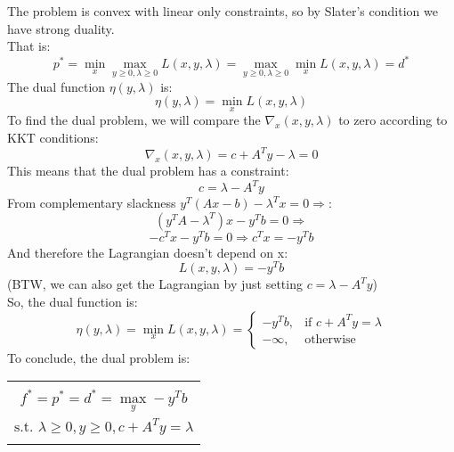 \documentclass[12pt]{article}
\newcommand{\rectres}[1]{
\begin{center}
\begin{tabular}{ |c| }
\hline
\\
 #1\\
 \\
\hline
\end{tabular}
\end{center}
}
\begin{document}
The problem is convex with linear only constraints, so by Slater's condition we have strong duality.\\
That is:
$$p^*=\min_x \max_{y \geq 0,\lambda \geq 0} L(x,y,\lambda) = \max_{y \geq 0,\lambda \geq 0} \min_x  L(x,y,\lambda) = d^*$$
The dual function $\eta(y,\lambda)$ is:
$$\eta(y,\lambda) = \min_x  L(x,y,\lambda)$$
To find the dual problem, we will compare the $\nabla_x (x,y,\lambda)$ to zero according to KKT conditions:\\
$$\nabla_x (x,y,\lambda) = c + A^Ty - \lambda = 0$$
This means that the dual problem has a constraint:\\
$$c = \lambda-A^Ty $$
From complementary slackness $y^T (Ax-b) -\lambda^T x= 0 \Rightarrow$:
$$(y^T A - \lambda^T)x - y^Tb = 0 \Rightarrow $$
$$-c^Tx - y^Tb = 0 \Rightarrow c^Tx = - y^Tb$$
And therefore the Lagrangian doesn't depend on x:\\
$$L(x,y,\lambda) = - y^Tb$$
(BTW, we can also get the Lagrangian by just setting $c=\lambda -A^Ty$)\\
So, the dual function is:
$$\eta(y,\lambda) = \min_x  L(x,y,\lambda) = \begin{cases}
			- y^Tb, & \text{if } c + A^Ty = \lambda\\
            -\infty, & \text{otherwise}
		 \end{cases}$$
To conclude, the dual problem is:
\rectres{
$$f^* = p^* = d^* = \max_y - y^Tb$$\\
$\text{s.t. } \lambda \geq 0, y \geq 0, c + A^Ty = \lambda$
}
\end{document}
